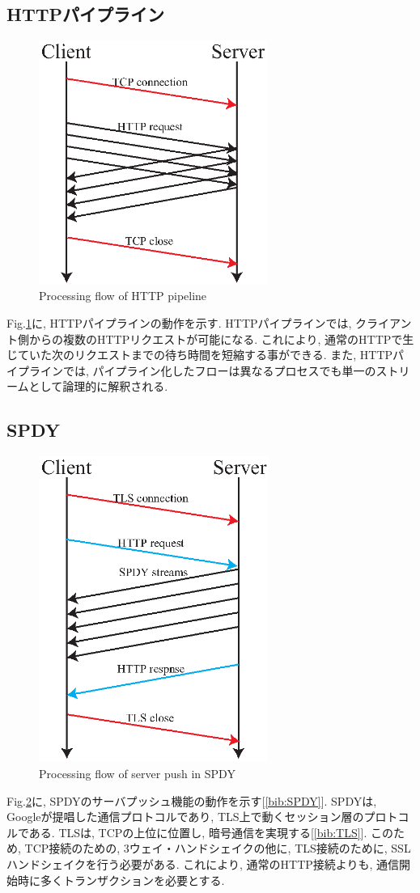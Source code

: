\documentclass[twocolumn]{jsarticle}
\begin{document}
\subsection{HTTPパイプライン}
\begin{figure}[h]
  \centering
  \includegraphics[width=7.5cm]{eps/HTTP_pipeline.eps}
  \caption{Processing flow of HTTP pipeline}
  \label{fig:pipeline}
\end{figure}
Fig.\ref{fig:pipeline}に, HTTPパイプラインの動作を示す.
HTTPパイプラインでは, クライアント側からの複数のHTTPリクエストが可能になる.
これにより, 通常のHTTPで生じていた次のリクエストまでの待ち時間を短縮する事ができる.
また, HTTPパイプラインでは, パイプライン化したフローは異なるプロセスでも単一のストリームとして論理的に解釈される.

\subsection{SPDY}
\begin{figure}[h]
  \centering
  \includegraphics[width=7.5cm]{eps/server_push.eps}
  \caption{Processing flow of server push in SPDY}
  \label{fig:spdy}
\end{figure}
Fig.\ref{fig:spdy}に, SPDYのサーバプッシュ機能の動作を示す[\ref{bib:SPDY}].
SPDYは, Googleが提唱した通信プロトコルであり, TLS上で動くセッション層のプロトコルである.
TLSは, TCPの上位に位置し, 暗号通信を実現する[\ref{bib:TLS}].
このため, TCP接続のための, 3ウェイ・ハンドシェイクの他に, TLS接続のために, SSLハンドシェイクを行う必要がある.
これにより, 通常のHTTP接続よりも, 通信開始時に多くトランザクションを必要とする.
\end{document}
